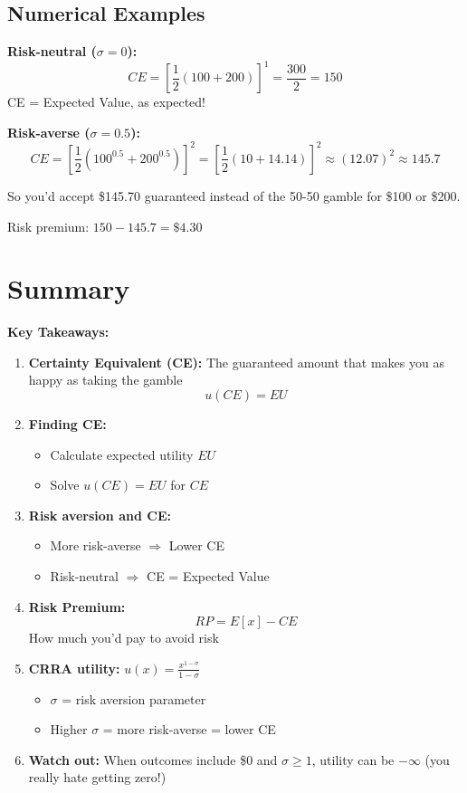 \documentclass[12pt]{article}
\begin{document}
\subsection*{Numerical Examples}

\textbf{Risk-neutral ($\sigma = 0$):}
\[
CE = \left[\frac{1}{2}(100 + 200)\right]^1 = \frac{300}{2} = 150
\]
CE = Expected Value, as expected!

\textbf{Risk-averse ($\sigma = 0.5$):}
\[
CE = \left[\frac{1}{2}(100^{0.5} + 200^{0.5})\right]^{2} = \left[\frac{1}{2}(10 + 14.14)\right]^2 \approx (12.07)^2 \approx 145.7
\]

So you'd accept \$145.70 guaranteed instead of the 50-50 gamble for \$100 or \$200.

Risk premium: $150 - 145.7 = \$4.30$

\newpage

\section*{Summary}

\begin{tcolorbox}[colback=green!5!white,colframe=green!75!black]
\textbf{Key Takeaways:}

\begin{enumerate}[leftmargin=*]
\item \textbf{Certainty Equivalent (CE):} The guaranteed amount that makes you as happy as taking the gamble
\[
u(CE) = EU
\]

\item \textbf{Finding CE:}
\begin{itemize}
\item Calculate expected utility $EU$
\item Solve $u(CE) = EU$ for $CE$
\end{itemize}

\item \textbf{Risk aversion and CE:}
\begin{itemize}
\item More risk-averse $\Rightarrow$ Lower CE
\item Risk-neutral $\Rightarrow$ CE = Expected Value
\end{itemize}

\item \textbf{Risk Premium:}
\[
RP = E[x] - CE
\]
How much you'd pay to avoid risk

\item \textbf{CRRA utility:} $u(x) = \frac{x^{1-\sigma}}{1-\sigma}$
\begin{itemize}
\item $\sigma$ = risk aversion parameter
\item Higher $\sigma$ = more risk-averse = lower CE
\end{itemize}

\item \textbf{Watch out:} When outcomes include \$0 and $\sigma \geq 1$, utility can be $-\infty$ (you really hate getting zero!)
\end{enumerate}
\end{tcolorbox}
\end{document}
